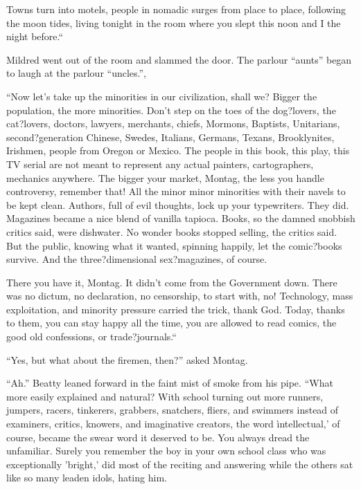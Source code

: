 \documentclass[11pt,openany]{book}
\begin{document}
Towns turn into motels, people in nomadic surges from place to place, following the moon tides, living tonight in the room where you slept this noon and I the night before.``

Mildred went out of the room and slammed the door. The parlour ``aunts'' began to laugh at the parlour ``uncles.'',

``Now let's take up the minorities in our civilization, shall we? Bigger the population, the more minorities. Don't step on the toes of the dog?lovers, the cat?lovers, doctors, lawyers, merchants, chiefs, Mormons, Baptists, Unitarians, second?generation Chinese, Swedes, Italians, Germans, Texans, Brooklynites, Irishmen, people from Oregon or Mexico. The people in this book, this play, this TV serial are not meant to represent any actual painters, cartographers, mechanics anywhere. The bigger your market, Montag, the less you handle controversy, remember that! All the minor minor minorities with their navels to be kept clean. Authors, full of evil thoughts, lock up your typewriters. They did. Magazines became a nice blend of vanilla tapioca. Books, so the damned snobbish critics said, were dishwater. No wonder books stopped selling, the critics said. But the public, knowing what it wanted, spinning happily, let the comic?books survive. And the three?dimensional sex?magazines, of course.

There you have it, Montag. It didn't come from the Government down. There was no dictum, no declaration, no censorship, to start with, no! Technology, mass exploitation, and minority pressure carried the trick, thank God. Today, thanks to them, you can stay happy all the time, you are allowed to read comics, the good old confessions, or trade?journals.``

``Yes, but what about the firemen, then?'' asked Montag.

``Ah.'' Beatty leaned forward in the faint mist of smoke from his pipe. ``What more easily explained and natural? With school turning out more runners, jumpers, racers, tinkerers, grabbers, snatchers, fliers, and swimmers instead of examiners, critics, knowers, and imaginative creators, the word ìntellectual,' of course, became the swear word it deserved to be. You always dread the unfamiliar. Surely you remember the boy in your own school class who was exceptionally 'bright,' did most of the reciting and answering while the others sat like so many leaden idols, hating him.
\end{document}
